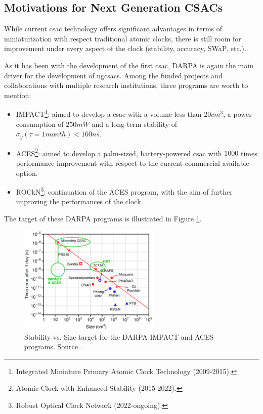 \subsection{Motivations for Next Generation CSACs}
\label{subsec:motivations}

While current \acrshort{csac} technology offers significant advantages in terms of miniaturization with respect traditional atomic clocks, there is still room for improvement under every aspect of the clock (stability, accuracy, SWaP, etc.).

As it has been with the development of the first \acrshort{csac}, DARPA is again the main driver for the development of \acrshort{ngcsacs}.
Among the funded projects and collaborations with multiple research institutions, three programs are worth to mention:

\begin{itemize}
    \item IMPACT\footnote{Integrated Miniature Primary Atomic Clock Technology (2009-2015).}: aimed to develop a \acrshort{csac} with a volume less than $20cm^3$, a power consumption of $250mW$ and a long-term stability of $\sigma_y(\tau=1month) < 160ns$.
    \item ACES\footnote{Atomic Clock with Enhanced Stability (2015-2022).}: aimed to develop a palm-sized, battery-powered \acrshort{csac} with $1000$ times performance improvement with respect to the current commercial available option.
    \item ROCkN\footnote{Robust Optical Clock Network (2022-ongoing).}: continuation of the ACES program, with the aim of further improving the performances of the clock.
\end{itemize}

The target of these DARPA programs is illustrated in Figure \ref{fig:DARPA-stability-target}.

\begin{figure}[H]
    \centering
    \includegraphics[width=0.6\textwidth, max width=\linewidth]{img/DARPA-stability-target.jpg}
    \caption{Stability vs. Size target for the DARPA IMPACT and ACES programs. Source \cite{Marlow-Scherer}.}
    \label{fig:DARPA-stability-target}
\end{figure}

